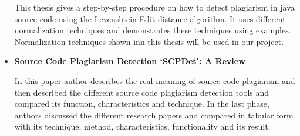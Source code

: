 \begin{itemize}
				This thesis gives a step-by-step procedure on how to detect plagiarism in java source code using the Levenshtein Edit distance algorithm. It uses different normalization techniques and demonstrates these techniques using examples. Normalization techniques shown inn this thesis will be used in our project.
				
				\item \textbf{Source Code Plagiarism Detection ‘SCPDet’: A Review}
				
				In this paper author describes the real meaning of source code plagiarism and  then described the different source code plagiarism detection tools and compared its function, characteristics and technique. In the last phase, authors discussed the different research papers and compared in tabular form with its technique, method, characteristics, functionality and its result.
				
				\end{itemize} 
				
\newpage
